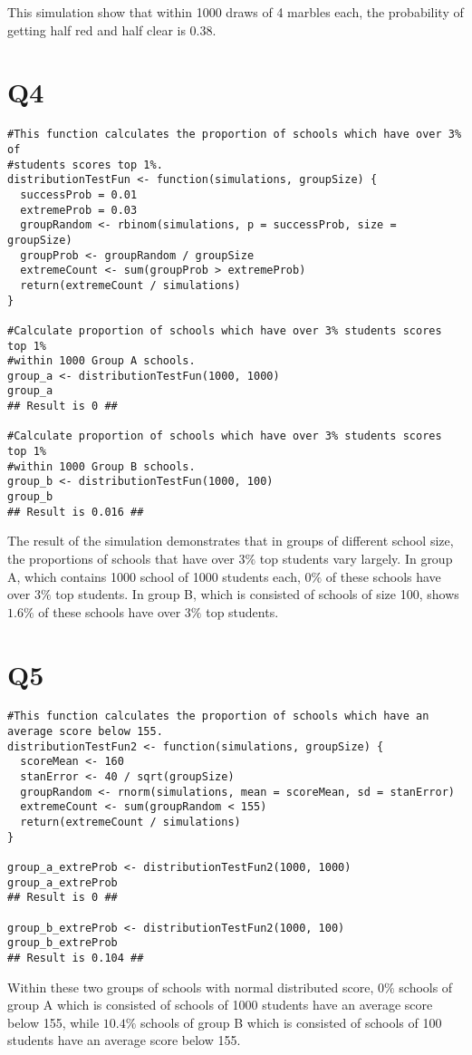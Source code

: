 \documentclass[12pt]{article}
\begin{document}
\noindent This simulation show that within 1000 draws of 4 marbles each, the probability of getting half red and half clear is 0.38.


\section*{Q4}
\begin{verbatim}
#This function calculates the proportion of schools which have over 3% of 
#students scores top 1%.
distributionTestFun <- function(simulations, groupSize) {
  successProb = 0.01
  extremeProb = 0.03
  groupRandom <- rbinom(simulations, p = successProb, size = groupSize)
  groupProb <- groupRandom / groupSize
  extremeCount <- sum(groupProb > extremeProb)
  return(extremeCount / simulations)
}

#Calculate proportion of schools which have over 3% students scores top 1% 
#within 1000 Group A schools.
group_a <- distributionTestFun(1000, 1000)
group_a
## Result is 0 ##

#Calculate proportion of schools which have over 3% students scores top 1% 
#within 1000 Group B schools.
group_b <- distributionTestFun(1000, 100)
group_b
## Result is 0.016 ##
\end{verbatim}

\noindent The result of the simulation demonstrates that in groups of different school size, the proportions of schools that have over $3 \%$ top students vary largely. In group A, which contains 1000 school of 1000 students each, $0 \%$ of these schools have over $3 \%$ top students. In group B, which is consisted of schools of size 100, shows $1.6 \%$ of these schools have over $3 \%$ top students. 


\section*{Q5}
\begin{verbatim}
#This function calculates the proportion of schools which have an average score below 155.
distributionTestFun2 <- function(simulations, groupSize) {
  scoreMean <- 160
  stanError <- 40 / sqrt(groupSize)
  groupRandom <- rnorm(simulations, mean = scoreMean, sd = stanError)
  extremeCount <- sum(groupRandom < 155)
  return(extremeCount / simulations)
}

group_a_extreProb <- distributionTestFun2(1000, 1000)
group_a_extreProb
## Result is 0 ##

group_b_extreProb <- distributionTestFun2(1000, 100)
group_b_extreProb
## Result is 0.104 ##
\end{verbatim}

\noindent Within these two groups of schools with normal distributed score, $0 \%$ schools of group A which is consisted of schools of 1000 students have an average score below 155, while $10.4 \%$ schools of group B which is consisted of schools of 100 students have an average score below 155. 
\end{document}
